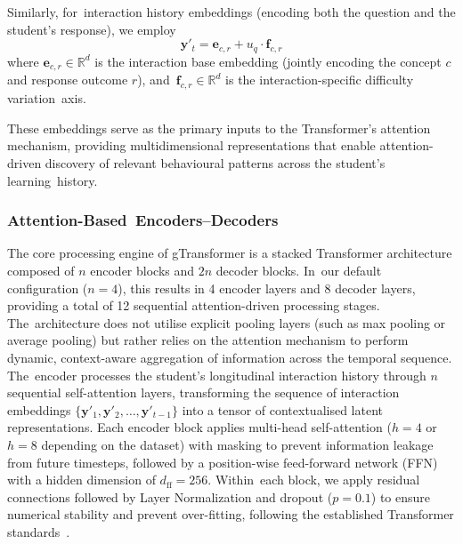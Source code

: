 \documentclass[applsci,article,accept,moreauthors,pdftex]{Definitions/mdpi}
\begin{document}
Similarly, for~interaction history embeddings (encoding both the question and the student's response), we employ
\begin{equation} \label{eq:interaction_embedding}
    \mathbf{y}'_t = \mathbf{e}_{c,r} + u_q \cdot \mathbf{f}_{c,r}
\end{equation}
where $\mathbf{e}_{c,r} \in \mathbb{R}^{d}$ is the interaction base embedding (jointly encoding the concept $c$ and response outcome $r$), and~$\mathbf{f}_{c,r} \in \mathbb{R}^{d}$ is the interaction-specific difficulty variation~axis. 


These embeddings serve as the primary inputs to the Transformer's attention mechanism, providing multidimensional representations that enable attention-driven discovery of relevant {behavioural} patterns across the student's learning~history.

\subsubsection{Attention-Based~Encoders--Decoders} \label{sec_enc_dec}

The core processing engine of gTransformer is a stacked Transformer architecture composed of $n$ encoder blocks and $2n$ decoder blocks. In~our default configuration ($n=4$), this results in 4 encoder layers and 8 decoder layers, providing a total of 12 sequential attention-driven processing stages. The~architecture does not utilise explicit pooling layers (such as max pooling or average pooling) but rather relies on the attention mechanism to perform dynamic, context-aware aggregation of information across the temporal sequence. %
The~encoder processes the student's longitudinal interaction history through $n$ sequential self-attention layers, transforming the sequence of interaction embeddings $\{\mathbf{y}'_1, \mathbf{y}'_2, \ldots, \mathbf{y}'_{t-1}\}$ into a tensor of contextualised latent representations. Each encoder block applies multi-head self-attention ($h=4$ or $h=8$ depending on the dataset) with masking to prevent information leakage from future timesteps, followed by a position-wise feed-forward network (FFN) with a hidden dimension of $d_{\text{ff}} = 256$. Within~each block, we apply residual connections followed by Layer Normalization and dropout ($p=0.1$) to ensure numerical stability and prevent over-fitting, following the established Transformer standards~\citep{vaswani2017attention}.
\end{document}
